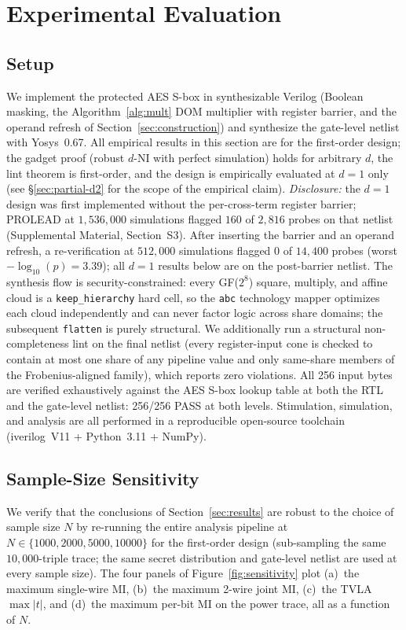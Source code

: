\documentclass[lettersize,journal]{IEEEtran}
\begin{document}
\section{Experimental Evaluation}
\label{sec:eval}
\subsection{Setup}
We implement the protected AES S-box in synthesizable
Verilog (Boolean masking, the Algorithm~\ref{alg:mult} DOM multiplier with
register barrier, and the operand refresh of
Section~\ref{sec:construction}) and synthesize the gate-level netlist with
Yosys~0.67.  All empirical results in this section are for the
first-order design; the gadget proof (robust $d$-NI with perfect simulation) holds for arbitrary $d$, the lint theorem is first-order, and the design is empirically evaluated at $d{=}1$ only (see \S\ref{sec:partial-d2} for the scope of the empirical claim).
\textit{Disclosure:} the $d{=}1$ design was first implemented without the per-cross-term register barrier; PROLEAD at $1{,}536{,}000$ simulations flagged $160$ of $2{,}816$ probes on that netlist (Supplemental Material, Section~S3). After inserting the barrier and an operand refresh, a re-verification at $512{,}000$ simulations flagged $0$ of $14{,}400$ probes (worst $-\log_{10}(p)=3.39$); all $d{=}1$ results below are on the post-barrier netlist.  The synthesis flow is security-constrained: every GF($2^8$)
square, multiply, and affine cloud is a \texttt{keep\_hierarchy} hard cell,
so the \texttt{abc} technology mapper optimizes each cloud independently
and can never factor logic across share domains; the subsequent
\texttt{flatten} is purely structural.  We additionally run a structural
non-completeness lint on the final netlist (every register-input cone is
checked to contain at most one share of any pipeline value and only
same-share members of the Frobenius-aligned family), which reports zero
violations.  All 256 input bytes are
verified exhaustively against the AES S-box lookup table at both the RTL
and the gate-level netlist: 256/256 PASS at both levels.  Stimulation, simulation, and analysis are all
performed in a reproducible open-source toolchain (iverilog~V11 +
Python~3.11 + NumPy).

\subsection{Sample-Size Sensitivity}
\label{sec:sensitivity}
We verify that the conclusions of Section~\ref{sec:results} are
robust to the choice of sample size $N$ by re-running the entire
analysis pipeline at $N \in \{1000, 2000, 5000, 10000\}$ for the
first-order design (sub-sampling the same $10{,}000$-triple trace; the same
secret distribution and gate-level netlist are used at every
sample size).  The four panels of Figure~\ref{fig:sensitivity}
plot (a)~the maximum single-wire MI,
(b)~the maximum 2-wire joint MI,
(c)~the TVLA $\max|t|$, and (d)~the maximum per-bit MI on the
power trace, all as a function of $N$.
\end{document}
